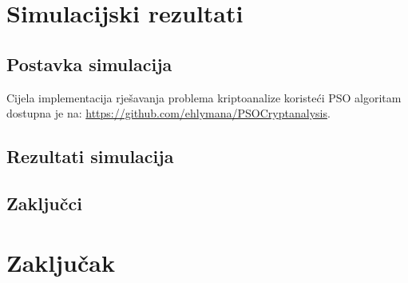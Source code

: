\documentclass[12pt, a4paper]{article}
\begin{document}
\newpage

\section{Simulacijski rezultati}

\subsection{Postavka simulacija}

Cijela implementacija rješavanja problema kriptoanalize koristeći PSO algoritam dostupna je na: \href{https://github.com/ehlymana/PSOCryptanalysis}{https://github.com/ehlymana/PSOCryptanalysis}.

\subsection{Rezultati simulacija}



\subsection{Zaključci}



\newpage

\section{Zaključak}



\newpage



\end{document}
